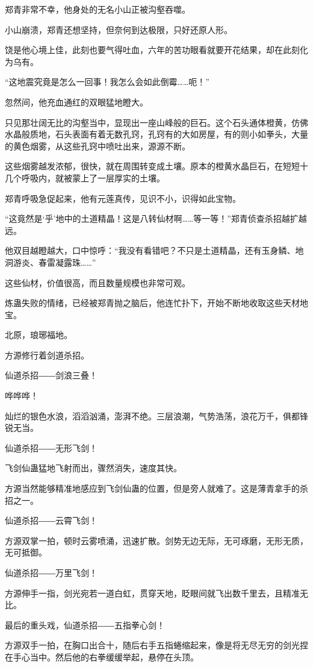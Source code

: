 \begin{this_body}
郑青非常不幸，他身处的无名小山正被沟壑吞噬。

小山崩溃，郑青还想坚持，但奈何到达极限，只好还原人形。

饶是他心境上佳，此刻也要气得吐血，六年的苦功眼看就要开花结果，却在此刻化为乌有。

“这地震究竟是怎么一回事！我怎么会如此倒霉……呃！”

忽然间，他充血通红的双眼猛地瞪大。

只见那壮阔无比的沟壑当中，显现出一座山峰般的巨石。这个石头通体橙黄，仿佛水晶般质地，石头表面有着无数孔窍，孔窍有的大如房屋，有的则小如拳头，大量的黄色烟雾，从这些孔窍中喷吐出来，源源不断。

这些烟雾越发浓郁，很快，就在周围转变成土壤。原本的橙黄水晶巨石，在短短十几个呼吸内，就被蒙上了一层厚实的土壤。

郑青呼吸急促起来，他有元莲真传，见识不小，识得如此宝物。

“这竟然是‘乎’地中的土道精晶！这是八转仙材啊……等一等！”郑青侦查杀招越扩越远。

他双目越瞪越大，口中惊呼：“我没有看错吧？不只是土道精晶，还有玉身鳞、地洞游炎、春雷凝露珠……”

这些仙材，价值很高，而且数量规模也非常可观。

炼蛊失败的情绪，已经被郑青抛之脑后，他连忙扑下，开始不断地收取这些天材地宝。

北原，琅琊福地。

方源修行着剑道杀招。

仙道杀招――剑浪三叠！

哗哗哗！

灿烂的银色水浪，滔滔汹涌，澎湃不绝。三层浪潮，气势浩荡，浪花万千，俱都锋锐无当。

仙道杀招――无形飞剑！

飞剑仙蛊猛地飞射而出，骤然消失，速度其快。

方源当然能够精准地感应到飞剑仙蛊的位置，但是旁人就难了。这是薄青拿手的杀招之一。

仙道杀招――云霄飞剑！

方源双掌一拍，顿时云雾喷涌，迅速扩散。剑势无边无际，无可琢磨，无形无质，无可抵御。

仙道杀招――万里飞剑！

方源伸手一指，剑光宛若一道白虹，贯穿天地，眨眼间就飞出数千里去，且精准无比。

最后的重头戏，仙道杀招――五指拳心剑！

方源双手一拍，在胸口出合十，随后右手五指蜷缩起来，像是将无尽无穷的剑光捏在手心当中。然后他的右拳缓缓举起，悬停在头顶。


\end{this_body}

